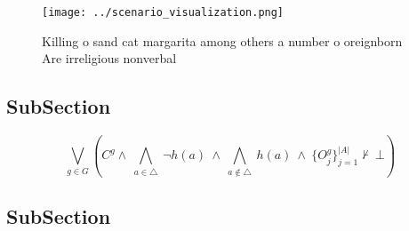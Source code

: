 \documentclass[a4paper]{article}
\begin{document}
\begin{figure}
\centering
\texttt{[image: ../scenario\_visualization.png]}
\caption{Killing o sand cat margarita among others a number o oreignborn Are irreligious nonverbal
}
\end{figure}
 
\subsection{SubSection}

\[\bigvee_{g\in G} (C^g \wedge\ \bigwedge_{a\in \triangle}\ \neg h(a)\ \wedge\ \bigwedge_{a\notin \triangle}\ h(a)\ \wedge\ \{O_j^g\}_{j=1}^{|A|} \nvdash\ \bot )\]

\subsection{SubSection}
\end{document}
